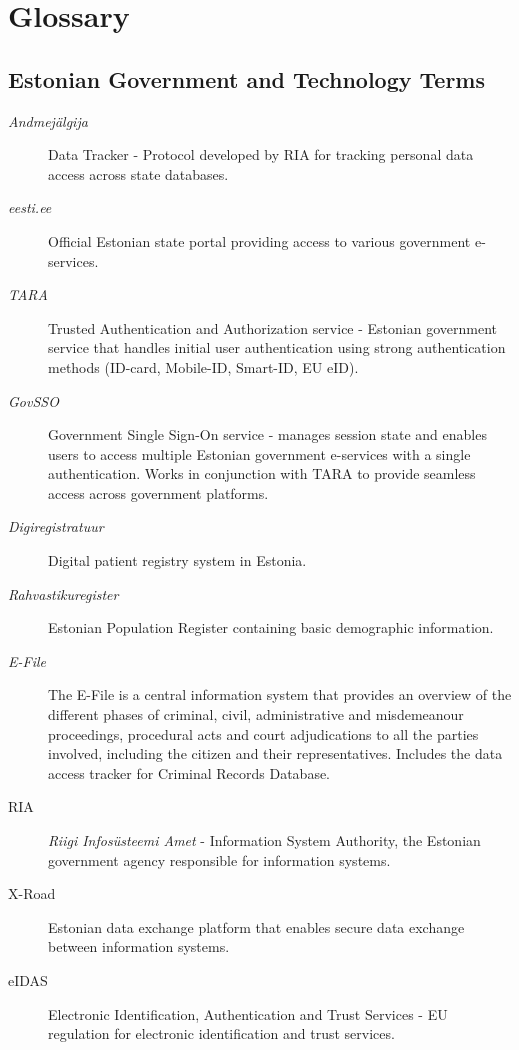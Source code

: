 \section{Glossary}

\subsection{Estonian Government and Technology Terms}

\begin{description}
    \item[\textit{Andmejälgija}] Data Tracker - Protocol developed by RIA for tracking personal data access across state databases.
    
    \item[\textit{eesti.ee}] Official Estonian state portal providing access to various government e-services.
    
    \item[\textit{TARA}] Trusted Authentication and Authorization service - Estonian government service that handles initial user authentication using strong authentication methods (ID-card, Mobile-ID, Smart-ID, EU eID).
    
    \item[\textit{GovSSO}] Government Single Sign-On service - manages session state and enables users to access multiple Estonian government e-services with a single authentication. Works in conjunction with TARA to provide seamless access across government platforms.
    
    \item[\textit{Digiregistratuur}] Digital patient registry system in Estonia.
    
    \item[\textit{Rahvastikuregister}] Estonian Population Register containing basic demographic information.
    
    \item[\textit{E-File}] The E-File is a central information system that provides an overview of the different phases of criminal, civil, administrative and misdemeanour proceedings, procedural acts and court adjudications to all the parties involved, including the citizen and their representatives.\cite{e-file-rik} Includes the data access tracker for Criminal Records Database. 
    
    \item[RIA] \textit{Riigi Infosüsteemi Amet} - Information System Authority, the Estonian government agency responsible for information systems.
    
    \item[X-Road] Estonian data exchange platform that enables secure data exchange between information systems.
    
    \item[eIDAS] Electronic Identification, Authentication and Trust Services - EU regulation for electronic identification and trust services.
\end{description}

